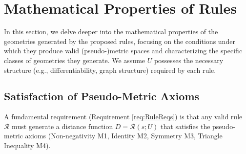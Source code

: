 \documentclass[twoside,twocolumn]{article}
\numberwithin{equation}{section} %
\begin{document}

\setcounter{equation}{0}
\section{Mathematical Properties of Rules}

In this section, we delve deeper into the mathematical properties of the geometries generated by the proposed rules, focusing on the conditions under which they produce valid (pseudo-)metric spaces and characterizing the specific classes of geometries they generate. We assume \( U \) possesses the necessary structure (e.g., differentiability, graph structure) required by each rule.

\newtheorem{proposition}{Proposition}[section] %

\subsection{Satisfaction of Pseudo-Metric Axioms}

A fundamental requirement (Requirement \ref{req:RuleReqs}) is that any valid rule \( \mathcal{R} \) must generate a distance function \( D = \mathcal{R}(s; U) \) that satisfies the pseudo-metric axioms (Non-negativity M1, Identity M2, Symmetry M3, Triangle Inequality M4).
\end{document}
